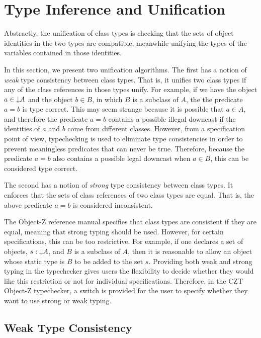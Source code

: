 \section{Type Inference and Unification}
\label{inference}

Abstractly, the unification of class types is checking that the sets
of object identities in the two types are compatible, meanwhile
unifying the types of the variables contained in those identities.

In this section, we present two unification algorithms. The first has
a notion of {\em weak} type consistency between class types. That is,
it unifies two class types if any of the class references in those
types unify.  For example, if we have the object $a \in \mathord\downarrow A$ and
the object $b \in B$, in which $B$ is a subclass of $A$, the the
predicate $a = b$ is type correct. This may seem strange because it is
possible that $a \in A$, and therefore the predicate $a = b$ contains
a possible illegal downcast if the identities of $a$ and $b$ come from
different classes.  However, from a specification point of view,
typechecking is used to eliminate type consistencies in order to
prevent meaningless predicates that can never be true. Therefore,
because the predicate $a = b$ also contains a possible legal downcast
when $a \in B$, this can be considered type correct.

The second has a notion of {\em strong} type consistency between class
types. It enforces that the sets of class references of two class
types are equal. That is, the above predicate $a = b$ is considered
inconsistent.

The Object-Z reference manual \cite{smith00} specifies that class
types are consistent if they are equal, meaning that strong typing
should be used.  However, for certain specifications, this can be too
restrictive. For example, if one declares a set of objects, $s : \mathord\downarrow
A$, and $B$ is a subclass of $A$, then it is reasonable to allow an
object whose static type is $B$ to be added to the set $s$. Providing
both weak and strong typing in the typechecker gives users the
flexibility to decide whether they would like this restriction or not
for individual specifications. Therefore, in the CZT Object-Z
typechecker, a switch is provided for the user to specify whether they
want to use strong or weak typing.

\subsection{Weak Type Consistency}

